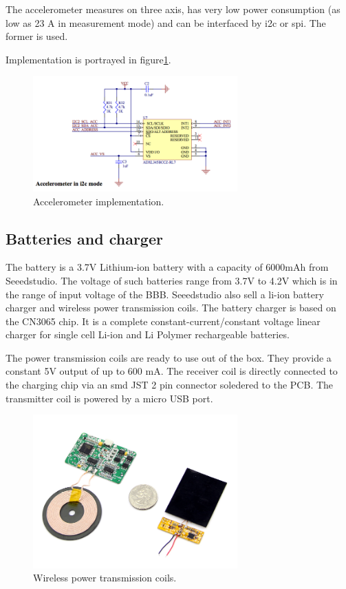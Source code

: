 The accelerometer measures on three axis, has very low power consumption (as low as 23 \textmu A in measurement mode) and can be interfaced by i2c or spi. The former is used.

Implementation is portrayed in figure\ref{fig:acc}.
\begin{figure}[!ht]
    \centering
    \includegraphics[width=0.7\textwidth,keepaspectratio]{chap/hardFig/acc_sch}
    \caption{Accelerometer implementation.}
    \label{fig:acc}
\end{figure}

\subsection{Batteries and charger}
The battery is a 3.7V Lithium-ion battery with a capacity of 6000mAh from Seeedstudio. The voltage of such batteries range from 3.7V to 4.2V which is in the range of input voltage of the BBB.
Seeedstudio also sell a li-ion battery charger and wireless power transmission coils. The battery charger is based on the CN3065 chip. It is a complete constant-current/constant voltage linear charger for single cell Li-ion and Li Polymer rechargeable batteries.

The power transmission coils are ready to use out of the box. They provide a constant 5V output of up to 600 mA.
The receiver coil is directly connected to the charging chip via an smd JST 2 pin connector soledered to the PCB. The transmitter coil is powered by a micro USB port.

\begin{figure}[!ht]
    \centering
    \includegraphics[width=0.7\textwidth,keepaspectratio]{chap/hardFig/wireless_charger}
    \caption{Wireless power transmission coils.}
    \label{fig:wireless charger}
\end{figure}

